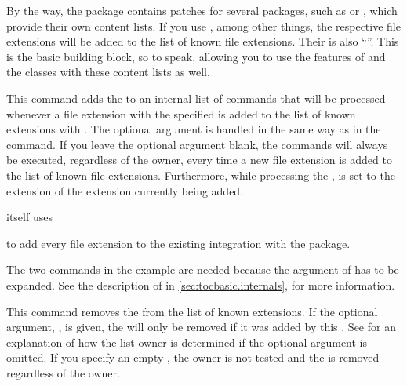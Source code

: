 By the way, the \hyperref[cha:scrhack]{}%
package contains patches for several packages, such as  or
, which provide their own content lists. If you use
\hyperref[cha:scrhack]{}, among other things, the respective
file extensions will be added to the list of known file extensions. Their
 is also ``''. This is the basic building block, so
to speak, allowing you to use the features of  and the
\KOMAScript{} classes with these content lists as well.%
\EndIndexGroup


\begin{Declaration}
\end{Declaration}
This command adds the  to an internal list of commands that
will be processed whenever a file extension with the specified 
is added to the list of known extensions with
. The optional argument is handled in the
same way as in the  command. If you leave
the optional argument blank, the commands will always be executed, regardless
of the owner, every time a new file extension is added to the list of known
file extensions. Furthermore, while processing the ,
 is set to the
extension of the extension currently being added.
\begin{Example}
   itself uses
\begin{lstcode}
  \AtAddToTocList[]{%
    \expandafter\tocbasic@extend@babel
    \expandafter{\@currext}%
  }
\end{lstcode}
  to add every file extension to the existing  integration 
  with the  package.
\end{Example}

The two  commands in the example are needed because the
argument of  has to be expanded.
See the description of  in
\autoref{sec:tocbasic.internals},
 for more information.%
\EndIndexGroup


\begin{Declaration}
\end{Declaration}
This command removes the  from the list of known extensions.
If the optional argument, , is given, the 
will only be removed if it was added by this . See
 for an explanation of how the list owner
is determined if the optional argument is omitted. If you specify an empty
, the owner is not tested and the  is removed
regardless of the owner.%
\EndIndexGroup


